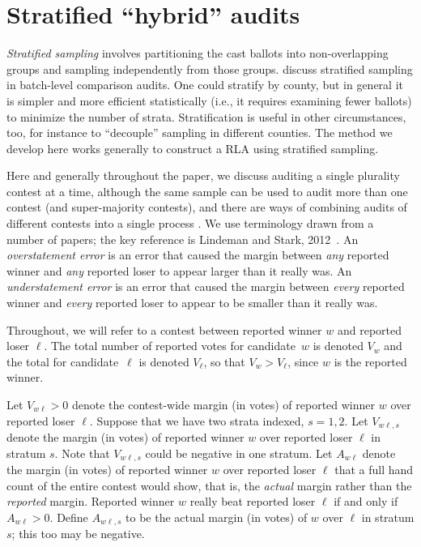 \documentclass[runningheads]{llncs}
\begin{document}
\section{Stratified ``hybrid'' audits} \label{sec:hybrid}

\emph{Stratified sampling} involves partitioning the cast ballots
into non-overlapping groups and sampling independently from those groups.
\cite{stark08a,higginsEtal11} discuss stratified sampling in batch-level comparison audits.
One could stratify by county, but in general it is simpler and more efficient
statistically (i.e., it requires examining fewer ballots) to minimize the number of strata.
Stratification is useful in other circumstances, too, for instance to ``decouple'' sampling
in different counties.
The method we develop here works generally to construct a RLA using stratified sampling.

Here and generally throughout the paper, we 
discuss auditing a single plurality contest at a time, although the same sample can be used to audit
more than one contest (and super-majority contests), and there are ways of combining audits of different contests into
a single process \cite{stark09c,stark10d}.
We use terminology drawn from a number of papers; the key reference is Lindeman and Stark, 2012~\cite{lindemanStark12}.
An \emph{overstatement error} is an error that caused the margin between \emph{any} reported
winner and \emph{any} reported loser to appear larger than it really was.
An \emph{understatement error} is an error that caused the margin between \emph{every} reported
winner and \emph{every} reported loser to appear to be smaller than it really was.

Throughout, we will refer to a contest between reported winner $w$ and reported loser $\ell$.
The total number of reported votes for candidate~$w$ is denoted $V_w$ 
and the total for candidate~$\ell$ is denoted $V_\ell$, so that $V_w > V_\ell$, since 
$w$ is the reported winner.

Let $V_{w\ell} > 0$ denote the contest-wide margin (in votes) of reported winner 
$w$ over reported loser $\ell$.
Suppose that we have two strata indexed, $s=1, 2.$
Let $V_{w\ell,s}$ denote the margin (in votes) of reported winner $w$ over reported loser $\ell$
in stratum $s$. 
Note that $V_{w\ell,s}$ could be negative in one stratum.
Let $A_{w\ell}$ denote the margin (in votes)
of reported winner $w$ over reported loser $\ell$ that 
a full hand count of the entire contest would show, that is, the \emph{actual} margin rather
than the \emph{reported} margin.
Reported winner $w$ really beat reported loser $\ell$ if and only if $A_{w\ell} > 0$.
Define $A_{w\ell,s}$ to be the actual margin (in votes) of $w$ over $\ell$ in stratum $s$;
this too may be negative.
\end{document}
